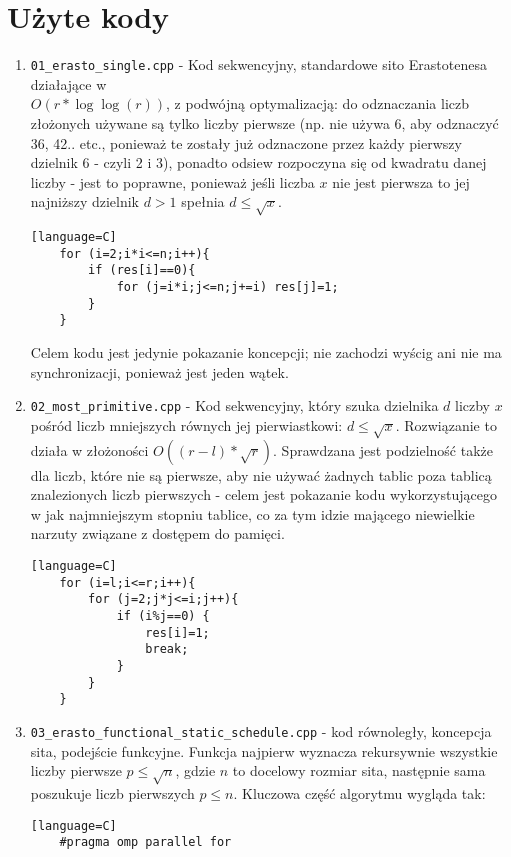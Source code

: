\documentclass[12pt]{article}
\begin{document}
\section{Użyte kody}
\begin {enumerate}
	\item \texttt{01\_erasto\_single.cpp} - Kod sekwencyjny, standardowe sito Erastotenesa działające w\\ \(O(r*\log \log(r))\), z podwójną optymalizacją: do odznaczania liczb złożonych używane są tylko liczby pierwsze (np. nie używa 6, aby odznaczyć 36, 42.. etc., ponieważ te zostały już odznaczone przez każdy pierwszy dzielnik 6 - czyli 2 i 3), ponadto odsiew rozpoczyna się od kwadratu danej liczby - jest to poprawne, ponieważ jeśli liczba \(x\) nie jest pierwsza to jej najniższy dzielnik \(d>1\) spełnia \(d\le \sqrt{x}\).
	\begin{lstlisting}[style=mystyle, caption= Sito Erastotenesa][language=C]
	for (i=2;i*i<=n;i++){
		if (res[i]==0){
			for (j=i*i;j<=n;j+=i) res[j]=1;
		}
	}
	\end{lstlisting}
	Celem kodu jest jedynie pokazanie koncepcji; nie zachodzi wyścig ani nie ma synchronizacji, ponieważ jest jeden wątek.
	\item \texttt{02\_most\_primitive.cpp} - Kod sekwencyjny, który szuka dzielnika \(d\) liczby \(x\) pośród liczb mniejszych równych jej pierwiastkowi: \(d \le \sqrt{x}\). Rozwiązanie to działa w złożoności \(O((r-l)*\sqrt{r})\). Sprawdzana jest podzielność także dla liczb, które nie są pierwsze, aby nie używać żadnych tablic poza tablicą znalezionych liczb pierwszych - celem jest pokazanie kodu wykorzystującego w jak najmniejszym stopniu tablice, co za tym idzie mającego niewielkie narzuty związane z dostępem do pamięci.
	\begin{lstlisting}[style=mystyle, caption= Rozwiązanie pierwiastkowe][language=C]
	for (i=l;i<=r;i++){
		for (j=2;j*j<=i;j++){
			if (i%j==0) {
				res[i]=1;
				break;
			}
		}
	}
	\end{lstlisting}
	\item \texttt{03\_erasto\_functional\_static\_schedule.cpp} - kod równoległy, koncepcja sita, podejście funkcyjne. Funkcja najpierw wyznacza rekursywnie wszystkie liczby pierwsze \(p\le \sqrt{n}\), gdzie \(n\) to docelowy rozmiar sita, następnie sama poszukuje liczb pierwszych \(p\le n\). Kluczowa część algorytmu wygląda tak:
	\begin{lstlisting}[style=mystyle, caption= Sito funkcyjne ze static schedulingiem][language=C]
	#pragma omp parallel for

\end{lstlisting}
\end{enumerate}
\end{document}
